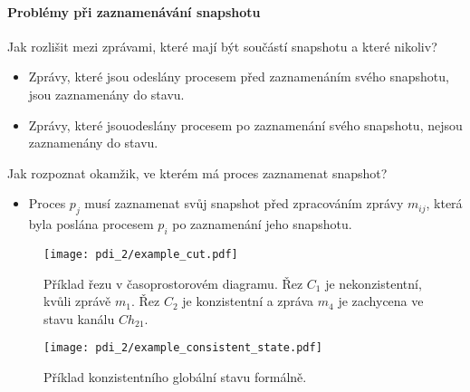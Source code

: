 \paragraph*{Problémy při zaznamenávání snapshotu} Jak rozlišit mezi zprávami, které mají být součástí snapshotu a které nikoliv?
\begin{itemize}
    \item Zprávy, které jsou odeslány procesem před zaznamenáním svého  snapshotu, jsou zaznamenány do stavu.
    \item Zprávy, které jsouodeslány procesem po zaznamenání svého  snapshotu, nejsou zaznamenány do stavu.
\end{itemize}

\noindent Jak rozpoznat okamžik, ve kterém má proces zaznamenat snapshot?
\begin{itemize}
    \item Proces $p_j$ musí zaznamenat svůj snapshot před zpracováním zprávy $m_{ij}$, která byla poslána procesem $p_i$ po zaznamenání jeho snapshotu.
\end{itemize}

\begin{figure}[H]
    \centering
    \texttt{[image: pdi\_2/example\_cut.pdf]}
    \caption{Příklad řezu v časoprostorovém diagramu. Řez $C_1$ je nekonzistentní, kvůli zprávě $m_1$. Řez $C_2$ je konzistentní a zpráva $m_4$ je zachycena ve stavu kanálu $Ch_{21}$.}
    \label{48_example_cut}
\end{figure}


\begin{figure}[H]
    \centering
    \texttt{[image: pdi\_2/example\_consistent\_state.pdf]}
    \caption{Příklad konzistentního globální stavu formálně.}
    \label{48_example_consistent_state}
\end{figure}

